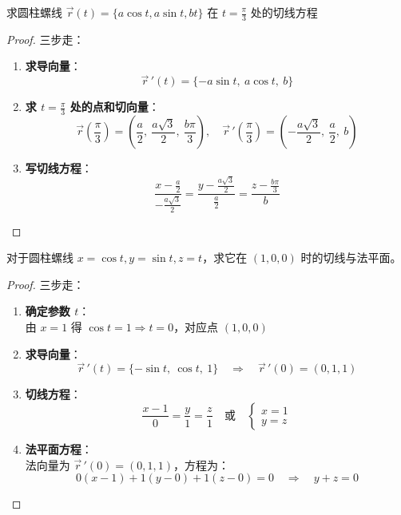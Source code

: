 \documentclass[lang=cn,10pt,thmcnt=section]{elegantbook}
\begin{document}
\begin{example}
	求圆柱螺线 $\vec{r}(t) = \{a\cos t, a\sin t, bt\}$ 在 $t = \frac{\pi}{3}$ 处的切线方程
\end{example}
\begin{proof}
	三步走：
	\begin{enumerate}
		\item \textbf{求导向量}：
		\[
			\vec{r}\,'(t) = \{-a\sin t,\ a\cos t,\ b\}
		\]
		
		\item \textbf{求 $t = \frac{\pi}{3}$ 处的点和切向量}：
		\[
			\vec{r}\left(\frac{\pi}{3}\right) = \left(\frac{a}{2},\ \frac{a\sqrt{3}}{2},\ \frac{b\pi}{3}\right), \quad 
			\vec{r}\,'\left(\frac{\pi}{3}\right) = \left(-\frac{a\sqrt{3}}{2},\ \frac{a}{2},\ b\right)
		\]
		
		\item \textbf{写切线方程}：
		\[
			\frac{x - \frac{a}{2}}{-\frac{a\sqrt{3}}{2}} = \frac{y - \frac{a\sqrt{3}}{2}}{\frac{a}{2}} = \frac{z - \frac{b\pi}{3}}{b}
		\]
	\end{enumerate}
\end{proof}
\begin{example}
	对于圆柱螺线 $x = \cos t, y = \sin t, z = t$，求它在 $(1, 0, 0)$ 时的切线与法平面。
\end{example}
\begin{proof}
	三步走：
	\begin{enumerate}
		\item \textbf{确定参数 $t$}：\\
		由 $x=1$ 得 $\cos t=1 \Rightarrow t=0$，对应点 $(1,0,0)$
		
		\item \textbf{求导向量}：
		\[
			\vec{r}\,'(t) = \{-\sin t,\ \cos t,\ 1\} \quad \Rightarrow \quad 
			\vec{r}\,'(0) = (0,1,1)
		\]
		
		\item \textbf{切线方程}：
		\[
			\frac{x-1}{0} = \frac{y}{1} = \frac{z}{1} \quad \text{或} \quad 
			\begin{cases} 
				x = 1 \\ 
				y = z 
			\end{cases}
		\]
		
		\item \textbf{法平面方程}：\\
		法向量为 $\vec{r}\,'(0) = (0,1,1)$，方程为：
		\[
			0(x-1) + 1(y-0) + 1(z-0) = 0 \quad \Rightarrow \quad y + z = 0
		\]
	\end{enumerate}
\end{proof}
\end{document}
